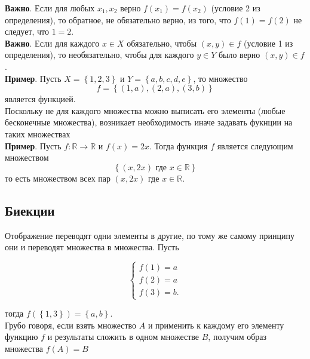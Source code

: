 \documentclass[]{article}
\begin{document}
\textbf{Важно}. Если для любых $x_1, x_2$ верно $f(x_1)=f(x_2)$ (условие 2 из определения), то обратное, не обязательно верно, из того, что $f(1)=f(2)$ не следует, что $1=2$.
\\

\textbf{Важно}. Если для каждого $x\in X$ обязательно, чтобы $(x,y)\in f$ (условие 1 из определения), то необязательно, чтобы для каждого $y\in Y$ было верно $(x,y)\in f$.
\\

\textbf{Пример}. Пусть $X=\left\{1,2,3\right\}$ и $Y=\left\{a,b,c,d,e\right\}$, то множество 
\begin{equation}
	f=\left\{(1,a),(2,a),(3,b)\right\}
\end{equation}
является функцией.
\\
	
	Поскольку не для каждого множества можно выписать его элементы (любые бесконечные множества), возникает необходимость иначе задавать фукнции на таких множествах
\\
	
	\textbf{Пример}. Пусть $f:\mathbb{R}\rightarrow\mathbb{R}$ и $f(x)=2x$.
	Тогда функция $f$ является следующим множеством 
	\begin{equation}
		\left\{(x,2x)\text{ где }x\in\mathbb{R}\right\}
	\end{equation}
	то есть множеством всех пар $(x,2x)$ где $x\in\mathbb{R}$.
	
	\subsection{Биекции}
	
	Отображение переводят одни элементы в другие, по тому же самому принципу они и переводят множества в множества. Пусть
	
		\begin{equation}
		\begin{cases}
			f(1)=a
			\\
			f(2)=a
			\\
			f(3)=b.
		\end{cases}
	\end{equation}
	
	тогда $f(\left\{1,3\right\})=\left\{a,b\right\}$.
	\\
	
	Грубо говоря, если взять множество $A$ и применить к каждому его элементу функцию $f$ и результаты сложить в одном множестве $B$, получим образ множества $f(A)=B$
	\\
	
\end{document}
